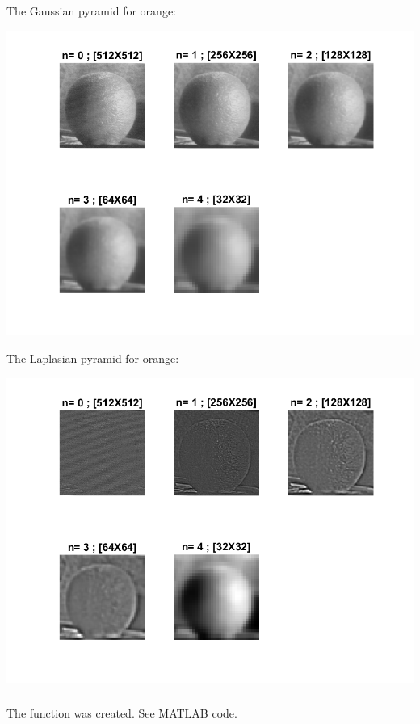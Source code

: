 \documentclass[a4paper]{iacas}
\begin{document}
The Gaussian pyramid for orange:
\vskip 0.1in
\begin{minipage}{1\textwidth}
\centering
	\includegraphics[scale=0.9]{../imgs/imgs_q5/q5_orange_gaus.png}
\end{minipage}
\vskip 0.1in

The Laplasian pyramid for orange:
\vskip 0.1in
\begin{minipage}{1\textwidth}
\centering
	\includegraphics[scale=0.9]{../imgs/imgs_q5/q5_orange_lap.png}
\end{minipage}
\vskip 0.1in


\subsubsection{}
The function was created. See MATLAB code.
\end{document}
